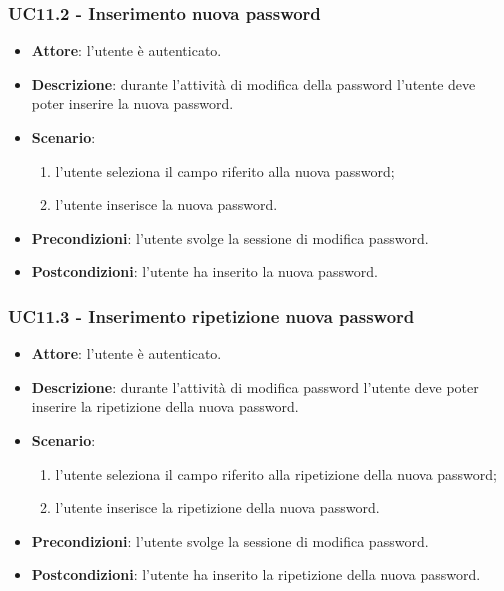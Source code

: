 \subsubsection{UC11.2 - Inserimento nuova password}
\begin{itemize}
    \item \textbf{Attore}: l'utente è autenticato.
    \item \textbf{Descrizione}: durante l'attività di modifica della password l'utente deve poter inserire la nuova password.
    \item \textbf{Scenario}:
    \begin{enumerate}
        \item l'utente seleziona il campo riferito alla nuova password;
        \item l'utente inserisce la nuova password.
    \end{enumerate}

    \item \textbf{Precondizioni}: l'utente svolge la sessione di modifica password.
    \item \textbf{Postcondizioni}: l'utente ha inserito la nuova password.
\end{itemize}

\subsubsection{UC11.3 - Inserimento ripetizione nuova password}
\begin{itemize}
    \item \textbf{Attore}: l'utente è autenticato.
    \item \textbf{Descrizione}: durante l'attività di modifica password l'utente deve poter inserire la ripetizione della nuova password.
    \item \textbf{Scenario}:
    \begin{enumerate}
        \item l'utente seleziona il campo riferito alla ripetizione della nuova password;
        \item l'utente inserisce la ripetizione della nuova password.
    \end{enumerate}

    \item \textbf{Precondizioni}: l'utente svolge la sessione di modifica password.
    \item \textbf{Postcondizioni}: l'utente ha inserito la ripetizione della nuova password.
\end{itemize}

